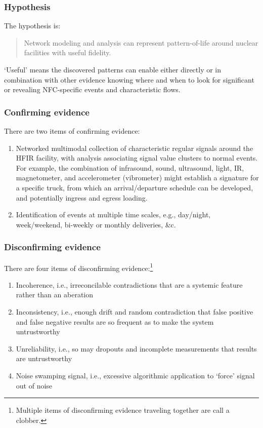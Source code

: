 \documentclass{article} %
\begin{document}
\subsubsection{Hypothesis}
The hypothesis is:
\begin{quote}
Network modeling and analysis can represent pattern-of-life around nuclear facilities with useful fidelity.
\end{quote}

`Useful' means the discovered patterns can enable either directly or in combination with other evidence knowing where and when to look for significant or revealing NFC-specific events and characteristic flows.

\subsubsection{Confirming evidence}
There are two items of confirming evidence:
\begin{enumerate}
\item Networked multimodal collection of characteristic regular signals around the HFIR facility, with analysis associating signal value clusters to normal events. For example, the combination of infrasound, sound, ultrasound, light, IR, magnetometer, and accelerometer (vibrometer) might establish a signature for a specific truck, from which an arrival/departure schedule can be developed, and potentially ingress and egress loading. 
\item Identification of events at multiple time scales, e.g., day/night, week/weekend, bi-weekly or monthly deliveries, \&c.
\end{enumerate}

\subsubsection{Disconfirming evidence}
There are four items of disconfirming evidence:\footnote{Multiple  items of disconfirming evidence traveling together are call a clobber.}
\begin{enumerate}
\item Incoherence, i.e., irreconcilable contradictions that are a systemic feature rather than an aberation
\item Inconsistency, i.e., enough drift and random contradiction that false positive and false negative results are so frequent as to make the system untrustworthy
\item Unreliability, i.e., so may dropouts and incomplete measurements that results are untrustworthy
\item Noise swamping signal, i.e., excessive algorithmic application to `force' signal out of noise
\end{enumerate}
\end{document}
